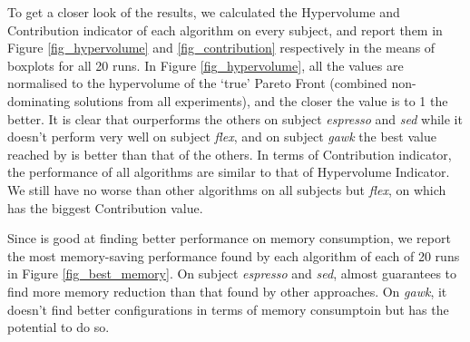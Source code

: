 To get a closer look of the results, we calculated the Hypervolume and Contribution indicator of each algorithm on every subject, and report them in Figure \ref{fig_hypervolume} and \ref{fig_contribution} respectively in the means of boxplots for all 20 runs. 
In Figure \ref{fig_hypervolume}, all the values are normalised to the hypervolume of the `true' Pareto Front (combined non-dominating solutions from all experiments), and the closer the value is to 1 the better. It is clear that \dn{} ourperforms the others on subject \emph{espresso} and \emph{sed} while it doesn't perform very well on subject \emph{flex}, and on subject \emph{gawk} the best value reached by \dn{} is better than that of the others.
In terms of Contribution indicator, the performance of all algorithms are similar to that of Hypervolume Indicator. We still have \dn{} no worse than other algorithms on all subjects but \emph{flex}, on which \sn{} has the biggest Contribution value.


Since \dn{} is good at finding better performance on memory consumption, we report the most memory-saving performance found by each algorithm of each of 20 runs in Figure \ref{fig_best_memory}. On subject \emph{espresso} and \emph{sed}, \dn{} almost guarantees to find more memory reduction than that found by other approaches. On \emph{gawk}, it doesn't find better configurations in terms of memory consumptoin but has the potential to do so.

